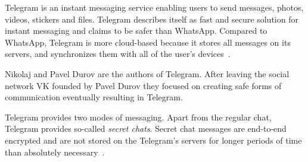 \documentclass[thesis=M,english]{FITthesis}[2012/10/20]
\begin{document}
Telegram is an instant messaging service enabling users to send messages, photos, videos, stickers and files. Telegram describes itself as fast and secure solution for instant messaging and claims to be safer than WhatsApp. Compared to WhatsApp, Telegram is more cloud-based because it stores all messages on its servers, and synchronizes them with all of the user's devices~\cite{telegramfaq}.

Nikolaj and Pavel Durov are the authors of Telegram. After leaving the social network VK founded by Pavel Durov they focused on creating safe forms of communication eventually resulting in Telegram.

Telegram provides two modes of messaging. Apart from the regular chat, Telegram provides so-called \emph{secret chats}. Secret chat messages are end-to-end encrypted and are not stored on the Telegram's servers for longer periods of time than absolutely necessary~\cite{telegramfaq}.
\end{document}
